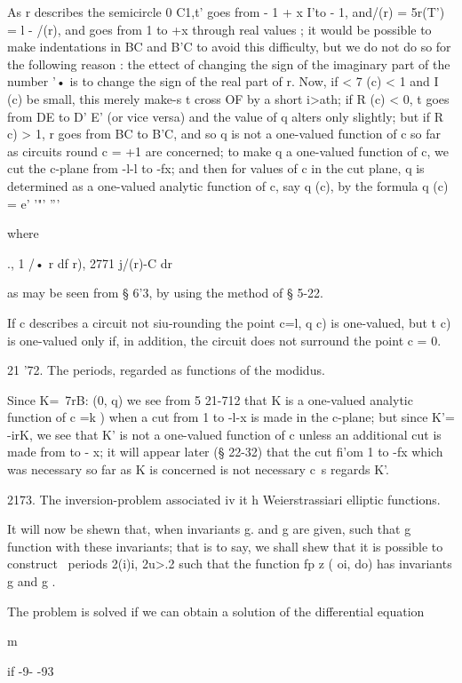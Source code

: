As r describes the semicircle 0 C1,t' goes from - 1 + x I'to - 1,
and/(r) = 5r(T') = l - /(r), and goes from 1 to +x through real values
; it would be possible to make indentations in BC and B'C to avoid
this difficulty, but we do not do so for the following reason : the
ettect of changing the sign of the imaginary part of the number '• is
to change the sign of the real part of r. Now, if < 7 (c) < 1 and I
(c) be small, this merely make-s t cross OF by a short i>ath; if R
(c) < 0, t goes from DE to D' E' (or vice versa) and the value of q
alters only slightly; but if R c) > 1, r goes from BC to B'C, and so
q is not a one-valued function of c so far as circuits round c = +1
are concerned; to make q a one-valued function of c, we cut the
c-plane from -l-l to -fx; and then for values of c in the cut plane,
q is determined as a one-valued analytic function of c, say q (c), by
the formula q (c) = e' '"' '''

where

., 1 /• r df r), 2771 j/(r)-C dr

as may be seen from § 6'3, by using the method of § 5-22.

If c describes a circuit not siu-rounding the point c=l, q c) is
one-valued, but t c) is one-valued only if, in addition, the circuit
does not surround the point c = 0.

21 '72. The periods, regarded as functions of the modidus.

Since K=\ 7rB: (0, q) we see from 5 21-712 that K is a one-valued
analytic function of c =k ) when a cut from 1 to -l-x is made in the
c-plane; but since K'= -irK, we see that K' is not a one-valued
function of c unless an additional cut is made from to - x; it will
appear later (§ 22-32) that the cut fi'om 1 to -fx which was necessary
so far as K is concerned is not necessary c\ s regards K'.

2173. The inversion-problem associated iv it h Weierstrassiari
elliptic functions.

It will now be shewn that, when invariants g. and g are given, such
that g %
function with these invariants; that is to say, we shall shew that it
is possible to construct \ periods 2(i)i, 2u>.2 such that the function
fp z ( oi, do) has invariants g and g .

The problem is solved if we can obtain a solution of the differential
equation

m

   if -9- -93

